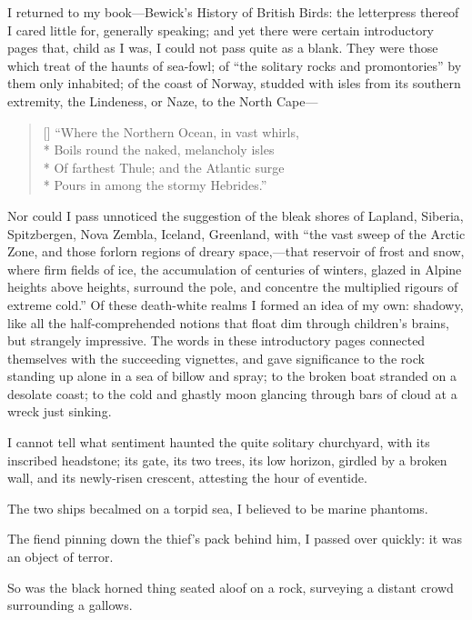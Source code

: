 I returned to my book---Bewick's History of British Birds: the
letterpress thereof I cared little for, generally speaking; and yet
there were certain introductory pages that, child as I was, I could not
pass quite as a blank. They were those which treat of the haunts of
sea-fowl; of \enquote{the solitary rocks and promontories} by them only
inhabited; of the coast of Norway, studded with isles from its southern
extremity, the Lindeness, or Naze, to the North Cape---

\begin{verse}[\versewidth]
	\enquote{Where the Northern Ocean, in vast whirls,\\*
		Boils round the naked, melancholy isles\\*
		Of farthest Thule; and the Atlantic surge\\*
		Pours in among the stormy Hebrides.}
\end{verse}

Nor could I pass unnoticed the suggestion of the bleak shores of
Lapland, Siberia, Spitzbergen, Nova Zembla, Iceland, Greenland, with
\enquote{the vast sweep of the Arctic Zone, and those forlorn regions of
	dreary space,---that reservoir of frost and snow, where firm fields of
	ice, the accumulation of centuries of winters, glazed in Alpine heights
	above heights, surround the pole, and concentre the multiplied rigours
	of extreme cold.} Of these death-white realms I formed an idea of my
own: shadowy, like all the half-comprehended notions that float dim
through children's brains, but strangely impressive. The words in these
introductory pages connected themselves with the succeeding vignettes,
and gave significance to the rock standing up alone in a sea of billow
and spray; to the broken boat stranded on a desolate coast; to the cold
and ghastly moon glancing through bars of cloud at a wreck just sinking.

I cannot tell what sentiment haunted the quite solitary churchyard, with
its inscribed headstone; its gate, its two trees, its low horizon,
girdled by a broken wall, and its newly-risen crescent, attesting the
hour of eventide.

The two ships becalmed on a torpid sea, I believed to be marine
phantoms.

The fiend pinning down the thief's pack behind him, I passed over
quickly: it was an object of terror.

So was the black horned thing seated aloof on a rock, surveying a
distant crowd surrounding a gallows.

